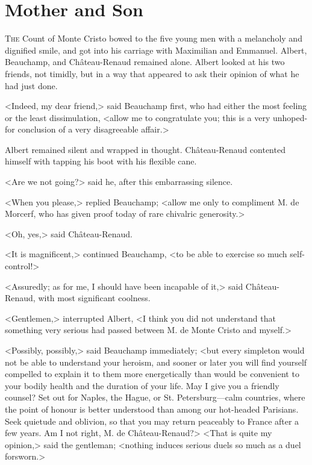 \chapter{Mother and Son} 

 \lettrine{T}{he} Count of Monte Cristo bowed to the five young men with a melancholy and dignified smile, and got into his carriage with Maximilian and Emmanuel. Albert, Beauchamp, and Château-Renaud remained alone. Albert looked at his two friends, not timidly, but in a way that appeared to ask their opinion of what he had just done. 

 <Indeed, my dear friend,> said Beauchamp first, who had either the most feeling or the least dissimulation, <allow me to congratulate you; this is a very unhoped-for conclusion of a very disagreeable affair.> 

 Albert remained silent and wrapped in thought. Château-Renaud contented himself with tapping his boot with his flexible cane. 

 <Are we not going?> said he, after this embarrassing silence. 

 <When you please,> replied Beauchamp; <allow me only to compliment M. de Morcerf, who has given proof today of rare chivalric generosity.> 

 <Oh, yes,> said Château-Renaud. 

 <It is magnificent,> continued Beauchamp, <to be able to exercise so much self-control!> 

 <Assuredly; as for me, I should have been incapable of it,> said Château-Renaud, with most significant coolness. 

 <Gentlemen,> interrupted Albert, <I think you did not understand that something very serious had passed between M. de Monte Cristo and myself.> 

 <Possibly, possibly,> said Beauchamp immediately; <but every simpleton would not be able to understand your heroism, and sooner or later you will find yourself compelled to explain it to them more energetically than would be convenient to your bodily health and the duration of your life. May I give you a friendly counsel? Set out for Naples, the Hague, or St. Petersburg—calm countries, where the point of honour is better understood than among our hot-headed Parisians. Seek quietude and oblivion, so that you may return peaceably to France after a few years. Am I not right, M. de Château-Renaud?>  <That is quite my opinion,> said the gentleman; <nothing induces serious duels so much as a duel forsworn.> 

